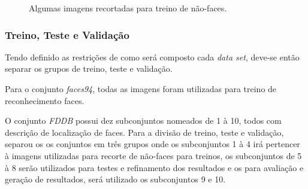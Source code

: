 \documentclass[10pt, conference]{IEEEtran}
\begin{document}
				\begin{figure}[H]
					\centering
					\qquad
					\qquad
					\caption{Algumas imagens recortadas para treino de não-faces.}%
					\label{fig:fddb_cut}%
				\end{figure}
			
			

		\subsubsection{Treino, Teste e Validação}
			Tendo definido as restrições de como será composto cada \textit{data set}, deve-se então separar os grupos de treino, teste e validação.
			
			Para o conjunto \textit{faces94}, todas as imagens foram utilizadas para treino de reconhecimento faces.
			
			O conjunto \textit{FDDB} possui dez subconjuntos nomeados de 1 à 10, todos com descrição de localização de faces. Para a divisão de treino, teste e validação, separou os os conjuntos em três grupos onde os subconjuntos 1 à 4 irá pertencer à imagens utilizadas para recorte de não-faces para treinos, os subconjuntos de 5 à 8 serão utilizados para testes e refinamento dos resultados e os para avaliação e geração de resultados, será utilizado os subconjuntos 9 e 10.
\end{document}
